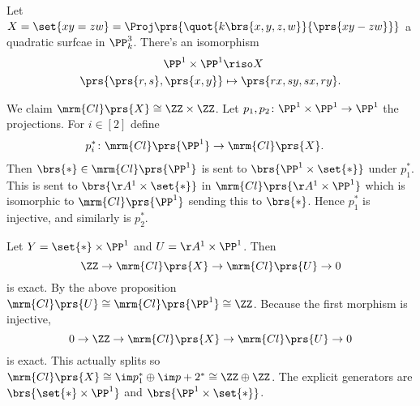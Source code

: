 \documentclass[10pt,a4paper,twoside,openany,hidelinks]{book}
\begin{document}
\begin{example}
Let $X = \set{xy = zw} = \Proj\prs{\quot{k\brs{x,y,z,w}}{\prs{xy - zw}}}$ a quadratic surfcae in $\PP_k^3$. There's an isomorphism
\begin{align*}
\PP^1 \times \PP^1 &\riso X \\
\prs{\prs{r,s},\prs{x,y}} &\mapsto \prs{rx, sy, sx, ry} \text{.}
\end{align*}

We claim $\mrm{Cl}\prs{X} \cong \ZZ \times \ZZ$.
Let $p_1, p_2 \colon \PP^1 \times \PP^1 \to \PP^1$ the projections.
For $i \in [2]$ define
\begin{align*}
p_i^* \colon \mrm{Cl}\prs{\PP^1} &\to \mrm{Cl}\prs{X} \text{.}
\end{align*}
Then $\brs{*} \in \mrm{Cl}\prs{\PP^1}$ is sent to $\brs{\PP^1 \times \set{*}}$ under $p_1^*$. This is sent to $\brs{\AA^1 \times \set{*}}$ in $\mrm{Cl}\prs{\AA^1 \times \PP^1}$ which is isomorphic to $\mrm{Cl}\prs{\PP^1}$ sending this to $\brs{*}$. Hence $p_1^*$ is injective, and similarly is $p_2^*$.

Let $Y = \set{*} \times \PP^1$ and $U = \AA^1 \times \PP^1$.
Then
\[\ZZ \to \mrm{Cl}\prs{X} \to \mrm{Cl}\prs{U} \to 0\]
is exact. By the above proposition $\mrm{Cl}\prs{U} \cong \mrm{Cl}\prs{\PP^1} \cong \ZZ$. Because the first morphism is injective,
\[0 \to \ZZ \to \mrm{Cl}\prs{X} \to \mrm{Cl}\prs{U} \to 0\]
is exact.
This actually splits so $\mrm{Cl}\prs{X} \cong \im p_1^* \oplus \im p+2^* \cong \ZZ \oplus \ZZ$.
The explicit generators are $\brs{\set{*} \times \PP^1}$ and $\brs{\PP^1 \times \set{*}}$.
\end{example}

\backmatter
\end{document}
